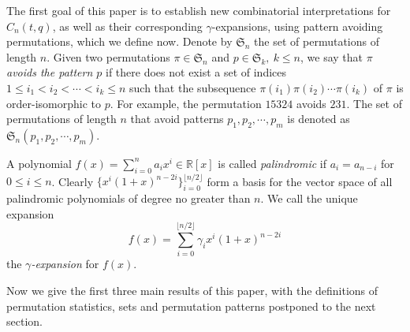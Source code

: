 \documentclass[12pt,reqno]{amsart}
\numberwithin{equation}{section}
\theoremstyle{plain}
\theoremstyle{definition}
\def\R{\mathbb{R}}
\def\S{\mathfrak{S}}
\begin{document}
The first goal of this paper is to establish new combinatorial interpretations for $C_n(t,q)$, as well as their corresponding $\gamma$-expansions, using pattern avoiding permutations, which we define now.
Denote by $\S_n$ the set of permutations of length $n$. Given two permutations $\pi\in\S_n$ and $p\in\S_k,\:k\leq n$, we say that \emph{$\pi$ avoids the pattern $p$} if there does not exist a set of indices $1\le i_1<i_2<\cdots<i_k\le n$  such that the subsequence $\pi(i_1)\pi(i_2)\cdots\pi(i_k)$ of $\pi$ is order-isomorphic to $p$. For example, the permutation $15324$ avoids $231$. The set of permutations of length $n$ that avoid patterns $p_1,p_2,\cdots,p_m$ is denoted as $\S_n(p_1,p_2,\cdots,p_m)$.

A polynomial $f(x)=\sum_{i=0}^{n} a_i x^i\in\R[x]$ is called \emph{palindromic} if $a_i=a_{n-i}$ for $0\le i \le n$. Clearly $\{x^i(1+x)^{n-2i}\}_{i=0}^{\lfloor n/2 \rfloor}$ form a basis for the vector space of all palindromic polynomials of degree no greater than $n$. We call the unique expansion
$$
f(x)=\sum_{i=0}^{\lfloor n/2 \rfloor}\gamma_ix^i(1+x)^{n-2i}
$$
 the \emph{$\gamma$-expansion} for $f(x)$.















Now we give the first three main results of this paper, with the definitions of permutation statistics, sets and permutation patterns postponed to the next section.
\end{document}
